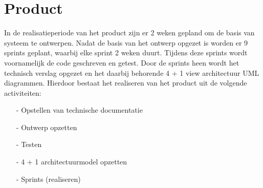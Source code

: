 \section{Product}
In de realisatieperiode van het product zijn er 2 weken gepland om de basis van systeem te ontwerpen.
Nadat de basis van het ontwerp opgezet is worden er 9 sprints geplant, waarbij elke sprint 2 weken duurt.
Tijdens deze sprints wordt voornamelijk de code geschreven en getest.
Door de sprints heen wordt het technisch verslag opgezet en het daarbij behorende 4 + 1 view architectuur \Parencite{4+1Model} UML diagrammen.
Hierdoor bestaat het realiseren van het product uit de volgende activiteiten: \\

\whitespace
\begin{itemize}
    \item[-] Opstellen van technische documentatie
    \item[-] Ontwerp opzetten
    \item[-] Testen
    \item[-] 4 + 1 architectuurmodel opzetten
    \item[-] Sprints (realiseren)
\end{itemize}
